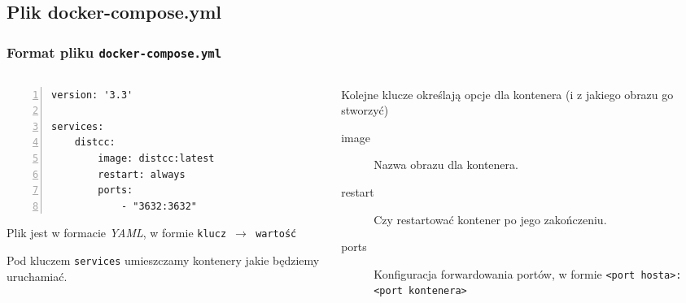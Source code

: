 \documentclass{beamer}
\begin{document}
\subsection{Plik docker-compose.yml}
\begin{frame}[fragile]
    \frametitle{Format pliku \texttt{docker-compose.yml}}
    \begin{columns}
        \begin{column}{0.45\textwidth}
            \begin{lstlisting}[frame=L,basicstyle=\scriptsize\ttfamily,numbers=left,
        morekeywords={version,services,image,ports,restart}]
version: '3.3'

services:
    distcc:
        image: distcc:latest
        restart: always
        ports:
            - "3632:3632"
    \end{lstlisting}
            Plik jest w formacie \emph{YAML}, w formie \texttt{klucz~$\rightarrow$~wartość}
    \pause

            \vspace{3mm}

            Pod kluczem \texttt{services} umieszczamy kontenery jakie będziemy uruchamiać.
        \end{column}
        \begin{column}{0.55\textwidth}
    \pause
            Kolejne klucze określają opcje dla kontenera (i z jakiego obrazu go stworzyć)

            \small{
                \begin{description}
                    \item[image] Nazwa obrazu dla kontenera.
    \pause
                    \item[restart] Czy restartować kontener po jego zakończeniu.
    \pause
                    \item[ports] Konfiguracja forwardowania portów, w formie \texttt{<port hosta>:<port kontenera>}
                \end{description}}
        \end{column}
    \end{columns}
\end{frame}
\end{document}
